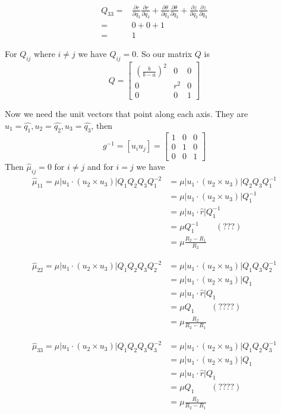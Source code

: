 \documentclass{amsart}
\begin{document}
\begin{align*}
Q_{33}
=&\frac{\partial r}{\partial q_3}\frac{\partial r}{\partial q_3}
+\frac{\partial \theta}{\partial q_3}\frac{\partial \theta}{\partial q_3}
+\frac{\partial z}{\partial q_3}\frac{\partial z}{\partial q_3}\\
=&0+0+1\\
=&1
\end{align*}

For $Q_{ij}$ where $i\neq j$ we have $Q_{ij}=0$. So our matrix $Q$ is
\[
  Q=\begin{bmatrix}
    \left(\frac{b}{b-a}\right)^2 & 0 & 0\\
    0 & r^2 & 0\\
    0 & 0 & 1
  \end{bmatrix}
\]

Now we need the unit vectors that point along each axis. They are $u_1=\widehat{q_1},u_2=\widehat{q_2},u_3=\widehat{q_3}$,
then
\[
  g^{-1}=
  [u_iu_j]=
  \begin{bmatrix}
    1 & 0 & 0\\
    0 & 1 & 0\\
    0 & 0 & 1
  \end{bmatrix}
\]
Then $\hat{\mu}_{ij}=0$ for $i\neq j$ and for $i=j$ we have
\begin{align*}
  \hat{\mu}_{11}=\mu|u_1\cdot(u_2\times u_3)|Q_1Q_2Q_3Q_1^{-2}
  &=\mu|u_1\cdot(u_2\times u_3)|Q_2Q_3Q_1^{-1}\\
  &=\mu|u_1\cdot(u_2\times u_3)|Q_1^{-1}\\
  &=\mu|u_1\cdot\hat{r}|Q_1^{-1}\\
  &=\mu Q_1^{-1}\qquad (???)\\
  &=\mu \frac{R_2-R_1}{R_2}
\end{align*}

\begin{align*}
  \hat{\mu}_{22}=\mu|u_1\cdot(u_2\times u_3)|Q_1Q_2Q_3Q_2^{-2}
  &=\mu|u_1\cdot(u_2\times u_3)|Q_1Q_3Q_2^{-1}\\
  &=\mu|u_1\cdot(u_2\times u_3)|Q_1\\
  &=\mu|u_1\cdot\hat{r}|Q_1\\
  &=\mu Q_1\qquad (????)\\
  &=\mu \frac{R_2}{R_2-R_1}
\end{align*}

\begin{align*}
  \hat{\mu}_{33}=\mu|u_1\cdot(u_2\times u_3)|Q_1Q_2Q_3Q_3^{-2}
  &=\mu|u_1\cdot(u_2\times u_3)|Q_1Q_2Q_3^{-1}\\
  &=\mu|u_1\cdot(u_2\times u_3)|Q_1\\
  &=\mu|u_1\cdot\hat{r}|Q_1\\
  &=\mu Q_1\qquad (????)\\
  &=\mu \frac{R_2}{R_2-R_1}
\end{align*}

\end{document}
